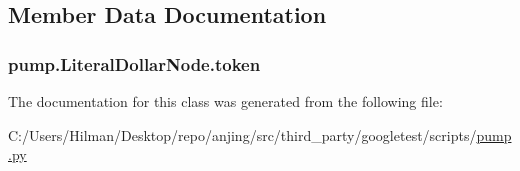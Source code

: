 \subsection{Member Data Documentation}
\hypertarget{classpump_1_1_literal_dollar_node_ab4c6e209635b8868bcdf0fe8053431c6}{}
\subsubsection[{token}]{\setlength{\rightskip}{0pt plus 5cm}pump.\+Literal\+Dollar\+Node.\+token}\label{classpump_1_1_literal_dollar_node_ab4c6e209635b8868bcdf0fe8053431c6}


The documentation for this class was generated from the following file\+:\begin{DoxyCompactItemize}
\item 
C\+:/\+Users/\+Hilman/\+Desktop/repo/anjing/src/third\+\_\+party/googletest/scripts/\hyperlink{pump_8py}{pump.\+py}\end{DoxyCompactItemize}
